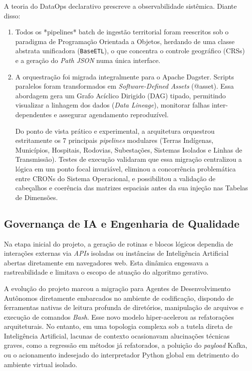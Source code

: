 \documentclass[12pt]{article}
\begin{document}
A teoria do DataOps declarativo prescreve a observabilidade sistêmica. Diante disso:
\begin{enumerate}
    \item Todos os *pipelines* batch de ingestão territorial foram reescritos sob o paradigma de Programação Orientada a Objetos, herdando de uma classe abstrata unificadora (\texttt{BaseETL}), o que concentra o controle geográfico (CRSs) e a geração do \textit{Path JSON} numa única interface.
    \item A orquestração foi migrada integralmente para o Apache Dagster. Scripts paralelos foram transformados em \textit{Software-Defined Assets} (@asset). Essa abordagem gera um Grafo Acíclico Dirigido (DAG) tipado, permitindo visualizar a linhagem dos dados (\textit{Data Lineage}), monitorar falhas inter-dependentes e assegurar agendamento reproduzível.
    
    Do ponto de vista prático e experimental, a arquitetura orquestrou estritamente os 7 principais \textit{pipelines} modulares (Terras Indígenas, Municípios, Hospitais, Rodovias, Subestações, Sistemas Isolados e Linhas de Transmissão). Testes de execução validaram que essa migração centralizou a lógica em um ponto focal invariável, eliminou a concorrência problemática entre CRONs do Sistema Operacional, e possibilitou a validação de cabeçalhos e coerência das matrizes espaciais antes da sua injeção nas Tabelas de Dimensões.
\end{enumerate}

\subsection{Governança de IA e Engenharia de Qualidade}
Na etapa inicial do projeto, a geração de rotinas e blocos lógicos dependia de interações externas via \textit{APIs} isoladas ou instâncias de Inteligência Artificial abertas diretamente em navegadores web. Esta dinâmica engessava a rastreabilidade e limitava o escopo de atuação do algoritmo gerativo.

A evolução do projeto marcou a migração para Agentes de Desenvolvimento Autônomos diretamente embarcados no ambiente de codificação, dispondo de ferramentas nativas de leitura profunda de diretórios, manipulação de arquivos e execução de comandos \textit{Bash}. Esse novo modelo hiper-acelerou as refatorações arquiteturais. No entanto, em uma topologia complexa sob a tutela direta de Inteligência Artificial, lacunas de contexto ocasionavam alucinações técnicas graves, como a regressão em métodos já refatorados, a poluição do \textit{payload} Kafka, ou o acionamento indesejado do interpretador Python global em detrimento do ambiente virtual isolado.
\end{document}
